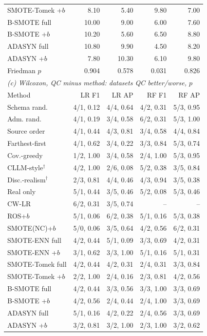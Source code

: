 \begin{table}[!t]
{\begin{tabular}{lrrrr}
SMOTE-Tomek +$b$ & 8.10 & 5.40 & 9.80 & 7.00 \\
B-SMOTE full & 10.00 & 9.00 & 6.00 & 7.60 \\
B-SMOTE +$b$ & 10.20 & 5.60 & 6.50 & 8.80 \\
ADASYN full & 10.80 & 9.90 & 4.50 & 8.20 \\
ADASYN +$b$ & 7.80 & 10.30 & 6.10 & 9.80 \\
Friedman $p$ & 0.904 & 0.578 & 0.031 & 0.826 \\
\midrule
\multicolumn{5}{l}{\textit{(c) Wilcoxon, QC minus method: datasets QC better/worse, $p$}} \\
Method & LR F1 & LR AP & RF F1 & RF AP \\
\midrule
Schema rand. & 4/1, 0.12 & 4/4, 0.64 & 4/2, 0.31 & 5/3, 0.95 \\
Adm. rand. & 4/1, 0.19 & 3/4, 0.58 & 6/2, 0.31 & 5/3, 1.00 \\
Source order & 4/1, 0.44 & 4/3, 0.81 & 3/4, 0.58 & 4/4, 0.84 \\
Farthest-first & 4/1, 0.62 & 3/4, 0.22 & 3/3, 0.84 & 5/3, 0.74 \\
Cov.-greedy & 1/2, 1.00 & 3/4, 0.58 & 2/4, 1.00 & 5/3, 0.95 \\
CLLM-style$^\dagger$ & 4/2, 1.00 & 2/6, 0.08 & 5/2, 0.38 & 3/5, 0.84 \\
Disc.-realism$^\dagger$ & 2/3, 0.81 & 4/4, 0.46 & 4/3, 0.94 & 3/5, 0.38 \\
Real only & 5/1, 0.44 & 3/5, 0.46 & 5/2, 0.08 & 5/3, 0.46 \\
CW-LR & 6/2, 0.31 & 3/5, 0.74 & -- & -- \\
ROS+$b$ & 5/1, 0.06 & 6/2, 0.38 & 5/1, 0.16 & 5/3, 0.38 \\
SMOTE(NC)+$b$ & 5/0, 0.06 & 3/5, 0.64 & 4/2, 0.56 & 6/2, 0.31 \\
SMOTE-ENN full & 4/2, 0.44 & 5/1, 0.09 & 3/3, 0.69 & 4/2, 0.31 \\
SMOTE-ENN +$b$ & 3/1, 0.62 & 3/3, 1.00 & 5/1, 0.16 & 5/1, 0.31 \\
SMOTE-Tomek full & 4/2, 0.44 & 4/2, 0.31 & 2/4, 0.31 & 3/3, 0.84 \\
SMOTE-Tomek +$b$ & 2/2, 1.00 & 2/4, 0.16 & 2/3, 0.81 & 4/2, 0.56 \\
B-SMOTE full & 4/2, 0.44 & 3/3, 0.56 & 3/3, 1.00 & 3/3, 0.69 \\
B-SMOTE +$b$ & 4/2, 0.56 & 2/4, 0.44 & 2/4, 1.00 & 3/3, 0.69 \\
ADASYN full & 5/1, 0.16 & 4/2, 0.22 & 2/4, 0.56 & 3/3, 0.69 \\
ADASYN +$b$ & 3/2, 0.81 & 3/2, 1.00 & 2/3, 1.00 & 3/2, 0.62 \\
\bottomrule
\end{tabular}}
\end{table}
